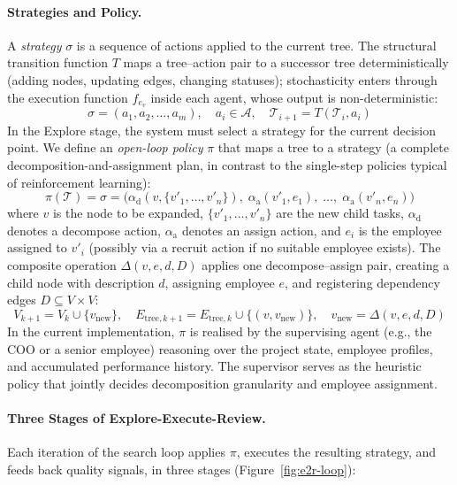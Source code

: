 \documentclass[11pt,a4paper]{article}
\begin{document}
\paragraph{Strategies and Policy.}
A \emph{strategy} $\sigma$ is a sequence of actions applied to the current tree.  The structural transition function $T$ maps a tree--action pair to a successor tree deterministically (adding nodes, updating edges, changing statuses); stochasticity enters through the execution function $f_{e_v}$ inside each agent, whose output is non-deterministic:
\begin{equation}
\sigma = (a_1, a_2, \ldots, a_m), \quad a_i \in \mathcal{A}, \quad \mathcal{T}_{i+1} = T(\mathcal{T}_i, a_i)
\end{equation}
In the Explore stage, the system must select a strategy for the current decision point.  We define an \emph{open-loop policy} $\pi$ that maps a tree to a strategy (a complete decomposition-and-assignment plan, in contrast to the single-step policies typical of reinforcement learning):
\begin{equation}
\pi(\mathcal{T}) = \sigma = \bigl(\alpha_{\text{d}}(v, \{v'_1, \ldots, v'_n\}),\; \alpha_{\text{a}}(v'_1, e_1),\; \ldots,\; \alpha_{\text{a}}(v'_n, e_n)\bigr)
\end{equation}
where $v$ is the node to be expanded, $\{v'_1, \ldots, v'_n\}$ are the new child tasks, $\alpha_{\text{d}}$ denotes a decompose action, $\alpha_{\text{a}}$ denotes an assign action, and $e_i$ is the employee assigned to $v'_i$ (possibly via a recruit action if no suitable employee exists).  The composite operation $\Delta(v, e, d, D)$ applies one decompose--assign pair, creating a child node with description $d$, assigning employee $e$, and registering dependency edges $D \subseteq V \times V$:
\begin{equation}
V_{k+1} = V_k \cup \{v_{\text{new}}\}, \quad E_{\text{tree},k+1} = E_{\text{tree},k} \cup \{(v, v_{\text{new}})\}, \quad v_{\text{new}} = \Delta(v, e, d, D)
\end{equation}
In the current implementation, $\pi$ is realised by the supervising agent (e.g., the COO or a senior employee) reasoning over the project state, employee profiles, and accumulated performance history.  The supervisor serves as the heuristic policy that jointly decides decomposition granularity and employee assignment.

\paragraph{Three Stages of Explore-Execute-Review.} Each iteration of the search loop applies $\pi$, executes the resulting strategy, and feeds back quality signals, in three stages (Figure~\ref{fig:e2r-loop}):
\end{document}
